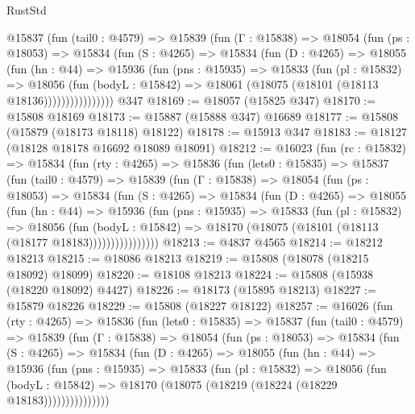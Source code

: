 \begin{lexlean}{RustStd}
\begin{coremodule}
          @15837
            (fun (tail0 : @4579) =>
            @15839
              (fun (Γ : @15838) =>
              @18054
                (fun (ps : @18053) =>
                @15834
                  (fun (S : @4265) =>
                  @15834
                    (fun (D : @4265) =>
                    @18055
                      (fun (hn : @44) =>
                      @15936
                        (fun (pns : @15935) =>
                        @15833
                          (fun (pl : @15832) =>
                          @18056
                            (fun (bodyL : @15842) =>
                            @18061 (@18075 (@18101 (@18113 @18136))))))))))))))))
    @347
@18169 := @18057 (@15825 @347)
@18170 := @15808 @18169
@18173 := @15887 (@15888 @347) @16689
@18177 := @15808 (@15879 (@18173 @18118) @18122)
@18178 := @15913 @347
@18183 := @18127 (@18128 @18178 @16692 @18089 @18091)
@18212 := @16023
    (fun (rc : @15832) =>
    @15834
      (fun (rty : @4265) =>
      @15836
        (fun (lets0 : @15835) =>
        @15837
          (fun (tail0 : @4579) =>
          @15839
            (fun (Γ : @15838) =>
            @18054
              (fun (ps : @18053) =>
              @15834
                (fun (S : @4265) =>
                @15834
                  (fun (D : @4265) =>
                  @18055
                    (fun (hn : @44) =>
                    @15936
                      (fun (pns : @15935) =>
                      @15833
                        (fun (pl : @15832) =>
                        @18056
                          (fun (bodyL : @15842) =>
                          @18170 (@18075 (@18101 (@18113 (@18177 @18183))))))))))))))))
@18213 := @4837 @4565
@18214 := @18212 @18213
@18215 := @18086 @18213
@18219 := @15808 (@18078 (@18215 @18092) @18099)
@18220 := @18108 @18213
@18224 := @15808 (@15938 (@18220 @18092) @4427)
@18226 := @18173 (@15895 @18213)
@18227 := @15879 @18226
@18229 := @15808 (@18227 @18122)
@18257 := @16026
    (fun (rty : @4265) =>
    @15836
      (fun (lets0 : @15835) =>
      @15837
        (fun (tail0 : @4579) =>
        @15839
          (fun (Γ : @15838) =>
          @18054
            (fun (ps : @18053) =>
            @15834
              (fun (S : @4265) =>
              @15834
                (fun (D : @4265) =>
                @18055
                  (fun (hn : @44) =>
                  @15936
                    (fun (pns : @15935) =>
                    @15833
                      (fun (pl : @15832) =>
                      @18056
                        (fun (bodyL : @15842) =>
                        @18170 (@18075 (@18219 (@18224 (@18229 @18183)))))))))))))))

\end{coremodule}
\end{lexlean}
